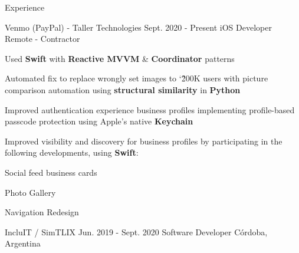 \documentclass{curriculum}
\begin{document}
\begin{cvsection}{Experience}


    \makesectionitemheader
        {Venmo (PayPal) - Taller Technologies}              {Sept. 2020 - Present}
        {iOS Developer}                                      {Remote - Contractor}

        \begin{sectionitemlist}

        \item{
            Used \textbf{Swift} with \textbf{Reactive MVVM} \& \textbf{Coordinator} patterns
        }
        \item{
            Automated fix to replace wrongly set images to \char`\~ 200K users with
            picture comparison automation using
            \textbf{structural similarity} in \textbf{Python}
        }
        \item{
            Improved authentication experience business profiles implementing
            profile-based passcode protection using Apple's native \textbf{Keychain}
        }
        \item{
            Improved visibility and discovery for business profiles by participating
            in the following developments, using \textbf{Swift}:
        }
        {
            \begin{colsectionitemlist}{3}
            \item{Social feed business cards}
            \item{Photo Gallery}
            \item{Navigation Redesign}
            \end{colsectionitemlist}
        }

        \end{sectionitemlist}


    \makesectionitemheader
        {IncluIT / SimTLIX}                             {Jun. 2019 - Sept. 2020}
        {Software Developer}                                {Córdoba, Argentina}

        \begin{sectionitemlist}


\end{sectionitemlist}
\end{cvsection}
\end{document}
